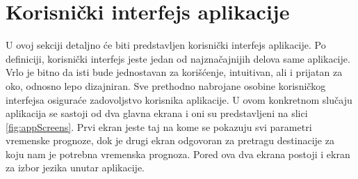 \documentclass[12pt,oneside]{memoir}
\begin{document}
\section{Korisnički interfejs aplikacije}

U ovoj sekciji detaljno će biti predstavljen korisnički interfejs aplikacije. Po definiciji, korisnički interfejs jeste jedan od najznačajnijih delova same aplikacije. Vrlo je bitno da isti bude jednostavan za korišćenje, intuitivan, ali i prijatan za oko, odnosno lepo dizajniran. Sve prethodno nabrojane osobine korisničkog interfejsa osiguraće zadovoljstvo korisnika aplikacije. U ovom konkretnom slučaju aplikacija se sastoji od dva glavna ekrana i oni su predstavljeni na slici \ref{fig:appScreens}. Prvi ekran jeste taj na kome se pokazuju svi parametri vremenske prognoze, dok je drugi ekran odgovoran za pretragu destinacije za koju nam je potrebna vremenska prognoza. Pored ova dva ekrana postoji i ekran za izbor jezika unutar aplikacije. 
\end{document}
